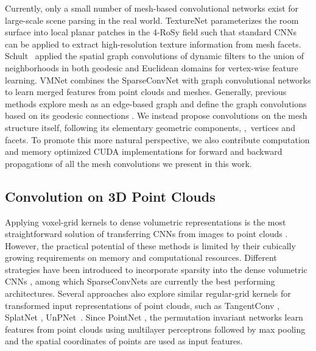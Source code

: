 {Currently, only a small number of mesh-based convolutional networks exist for large-scale scene parsing in the real world. TextureNet \cite{huang2019texturenet} parameterizes the room surface into local planar patches in the 4-RoSy field such that standard CNNs \cite{krizhevsky2012imagenet} can be applied to extract high-resolution texture information from mesh facets. Schult~\etal   \cite{schult2020dualconvmesh} applied the spatial graph convolutions of dynamic filters \cite{li2018pointcnn,simonovsky2017dynamic,wang2018dynamic,wu2019pointconv} to the union of  neighborhoods in both geodesic and Euclidean domains for vertex-wise feature learning. VMNet \cite{hu2021vmnet} combines the SparseConvNet \cite{tang2020searching} with graph convolutional networks to learn merged features from point clouds and meshes. 
Generally, previous methods explore mesh as an edge-based graph and define the graph convolutions based on its geodesic connections \cite{milano2020primal,verma2018feastnet,schult2020dualconvmesh,ranjan2018generating}. We instead propose convolutions on the mesh structure itself, following its elementary geometric components, \ie,~vertices and facets. To promote this more natural perspective, we also contribute computation and memory optimized CUDA implementations 
for forward and backward propagations of all the mesh convolutions we present in this work. 

\vspace{-1mm}
\subsection{Convolution on 3D Point Clouds}\label{subsec:convolution_pointcloud}
Applying voxel-grid kernels to dense volumetric representations is the most straightforward solution of transferring CNNs from images to point clouds \cite{wu20153d,maturana2015voxnet,zeng20163dmatch}.
However, the practical potential of these methods is limited by their cubically growing requirements on memory and computational resources. 
Different strategies have been introduced to incorporate sparsity into the dense volumetric CNNs \cite{EngelckeICRA2017,graham20183d,choy20194d,riegler2017octnet}, among which SparseConvNets \cite{graham20183d,choy20194d} are currently the best performing architectures.  
Several approaches also explore similar regular-grid kernels for transformed input representations of point clouds, such as TangentConv \cite{tatarchenko2018tangent}, SplatNet \cite{su2018splatnet},  UnPNet~\cite{li2021rethinking}.
Since PointNet \cite{qi2017pointnet}, the permutation invariant networks learn features from point clouds using multilayer perceptrons followed by max pooling~\cite{klokov2017escape,qi2017pointnet,qi2017pointnetplusplus,wu2019pointconv} and the spatial coordinates of points are used as input features.

}
